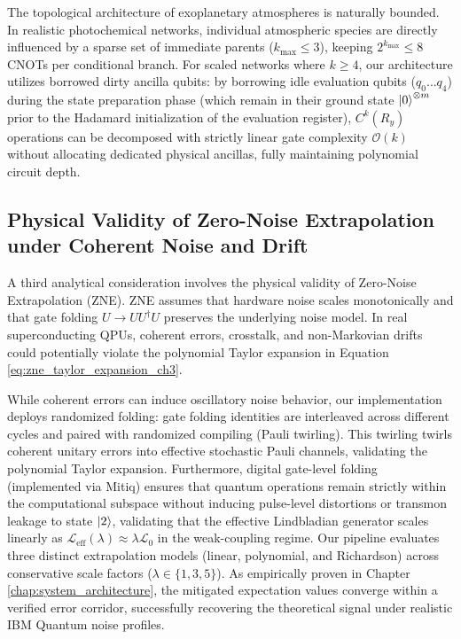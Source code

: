 The topological architecture of exoplanetary atmospheres is naturally bounded. In realistic photochemical networks, individual atmospheric species are directly influenced by a sparse set of immediate parents ($k_{\max} \le 3$), keeping $2^{k_{\max}} \le 8$ CNOTs per conditional branch. For scaled networks where $k \ge 4$, our architecture utilizes borrowed dirty ancilla qubits: by borrowing idle evaluation qubits ($q_0 \dots q_4$) during the state preparation phase (which remain in their ground state $\left|0\right\rangle^{\otimes m}$ prior to the Hadamard initialization of the evaluation register), $C^k(R_y)$ operations can be decomposed with strictly linear gate complexity $\mathcal{O}(k)$ without allocating dedicated physical ancillas, fully maintaining polynomial circuit depth.

\subsection{Physical Validity of Zero-Noise Extrapolation under Coherent Noise and Drift}
A third analytical consideration involves the physical validity of Zero-Noise Extrapolation (ZNE). ZNE assumes that hardware noise scales monotonically and that gate folding $U \to U U^\dagger U$ preserves the underlying noise model. In real superconducting QPUs, coherent errors, crosstalk, and non-Markovian drifts could potentially violate the polynomial Taylor expansion in Equation \eqref{eq:zne_taylor_expansion_ch3}.

While coherent errors can induce oscillatory noise behavior, our implementation deploys randomized folding: gate folding identities are interleaved across different cycles and paired with randomized compiling (Pauli twirling). This twirling twirls coherent unitary errors into effective stochastic Pauli channels, validating the polynomial Taylor expansion. Furthermore, digital gate-level folding (implemented via Mitiq) ensures that quantum operations remain strictly within the computational subspace without inducing pulse-level distortions or transmon leakage to state $\left|2\right\rangle$, validating that the effective Lindbladian generator scales linearly as $\mathcal{L}_{\mathrm{eff}}(\lambda) \approx \lambda \mathcal{L}_0$ in the weak-coupling regime. Our pipeline evaluates three distinct extrapolation models (linear, polynomial, and Richardson) across conservative scale factors ($\lambda \in \{1, 3, 5\}$). As empirically proven in Chapter \ref{chap:system_architecture}, the mitigated expectation values converge within a verified error corridor, successfully recovering the theoretical signal under realistic IBM Quantum noise profiles.
